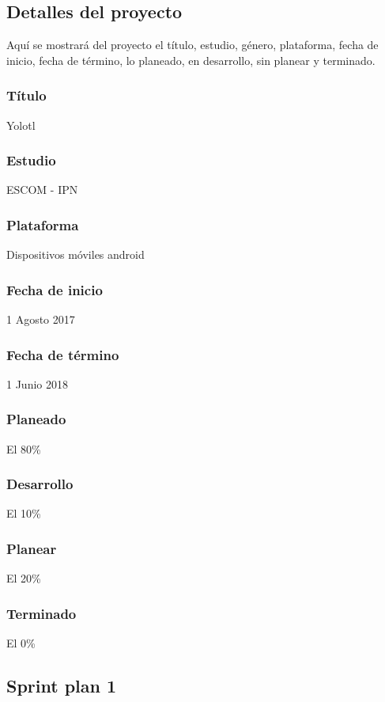 \subsection{Detalles del proyecto}
Aquí se mostrará del proyecto el título, estudio, género, plataforma, fecha de inicio, fecha de término, lo planeado, en desarrollo, sin planear y terminado.
\\
\subsubsection{Título}
Yolotl

\subsubsection{Estudio}
ESCOM - IPN

\subsubsection{Plataforma}
Dispositivos móviles android

\subsubsection{Fecha de inicio}
1 Agosto 2017

\subsubsection{Fecha de término}
1 Junio 2018
\subsubsection{Planeado}
El 80\%
\subsubsection{Desarrollo}
El 10\%
\subsubsection{Planear}
El 20\%
\subsubsection{Terminado}
El 0\%



\subsection{Sprint plan 1}
